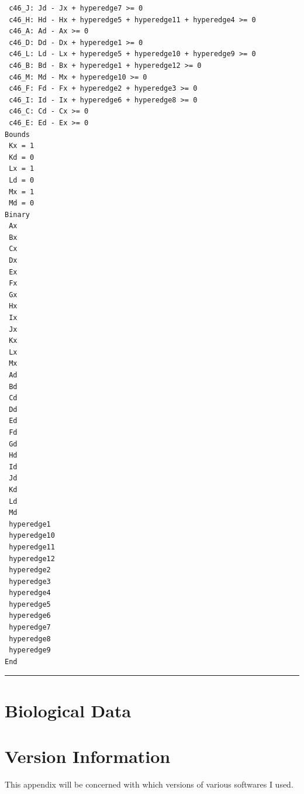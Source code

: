 \documentclass[12pt,twoside]{reedthesis}
\theoremstyle{definition}
\begin{document}
\begin{lstlisting}
 c46_J: Jd - Jx + hyperedge7 >= 0
 c46_H: Hd - Hx + hyperedge5 + hyperedge11 + hyperedge4 >= 0
 c46_A: Ad - Ax >= 0
 c46_D: Dd - Dx + hyperedge1 >= 0
 c46_L: Ld - Lx + hyperedge5 + hyperedge10 + hyperedge9 >= 0
 c46_B: Bd - Bx + hyperedge1 + hyperedge12 >= 0
 c46_M: Md - Mx + hyperedge10 >= 0
 c46_F: Fd - Fx + hyperedge2 + hyperedge3 >= 0
 c46_I: Id - Ix + hyperedge6 + hyperedge8 >= 0
 c46_C: Cd - Cx >= 0
 c46_E: Ed - Ex >= 0
Bounds
 Kx = 1
 Kd = 0
 Lx = 1
 Ld = 0
 Mx = 1
 Md = 0
Binary
 Ax
 Bx
 Cx
 Dx
 Ex
 Fx
 Gx
 Hx
 Ix
 Jx
 Kx
 Lx
 Mx
 Ad
 Bd
 Cd
 Dd
 Ed
 Fd
 Gd
 Hd
 Id
 Jd
 Kd
 Ld
 Md
 hyperedge1
 hyperedge10
 hyperedge11
 hyperedge12
 hyperedge2
 hyperedge3
 hyperedge4
 hyperedge5
 hyperedge6
 hyperedge7
 hyperedge8
 hyperedge9
End

        \end{lstlisting}
        \rule{\textwidth}{1pt}

      \chapter{Biological Data}

      \chapter{Version Information}

      This appendix will be concerned with which versions of various softwares I used.



  \backmatter %

    \nocite{*}


%  
 

\end{document}

